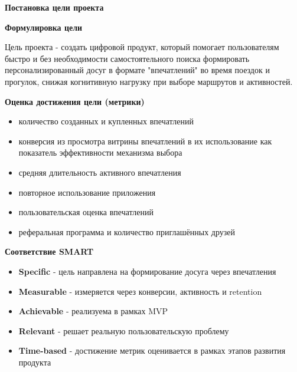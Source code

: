 \documentclass[a4paper]{article}
\begin{document}
\begin{description}
    \newpage
    \item[\Large3.] \Large \textbf{Постановка цели проекта}

    \item[\large3.1] \large \textbf{Формулировка цели}

     \normalsize Цель проекта - создать цифровой продукт, который помогает пользователям быстро и без необходимости самостоятельного поиска формировать персонализированный досуг в формате "впечатлений" во время поездок и прогулок, снижая когнитивную нагрузку при выборе маршрутов и активностей.

    \item[\large3.2] \large \textbf{Оценка достижения цели (метрики)}
    
    \normalsize
    \begin{itemize}[label=$-$]
        \item количество созданных и купленных впечатлений
        \item конверсия из просмотра витрины впечатлений в их использование как показатель эффективности механизма выбора
        \item средняя длительность активного впечатления
        \item повторное использование приложения
        \item пользовательская оценка впечатлений
        \item реферальная программа и количество приглашённых друзей
    \end{itemize}

    \item[\large3.3] \large \textbf{Соответствие SMART}
    
    \normalsize
    \begin{itemize}[label=$-$]
        \item \textbf{Specific} - цель направлена на формирование досуга через впечатления
        \item \textbf{Measurable} - измеряется через конверсии, активность и retention
        \item \textbf{Achievable} - реализуема в рамках MVP
        \item \textbf{Relevant} - решает реальную пользовательскую проблему
        \item \textbf{Time-based} - достижение метрик оценивается в рамках этапов развития продукта
    \end{itemize}
\end{description}
\end{document}

